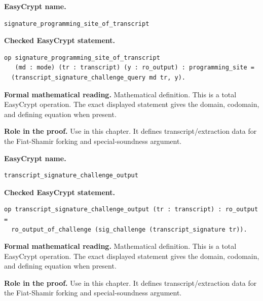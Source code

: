 \begin{formaldefinition}
\noindent\textbf{EasyCrypt name.}
\begin{lstlisting}[language=EasyCrypt,basicstyle=\ttfamily\scriptsize]
signature_programming_site_of_transcript
\end{lstlisting}
\noindent\textbf{Checked EasyCrypt statement.}
\begin{lstlisting}[language=EasyCrypt,basicstyle=\ttfamily\scriptsize]
op signature_programming_site_of_transcript
   (md : mode) (tr : transcript) (y : ro_output) : programming_site =
  (transcript_signature_challenge_query md tr, y).
\end{lstlisting}
\noindent\textbf{Formal mathematical reading.}
Mathematical definition. This is a total EasyCrypt operation.  The exact displayed statement gives the domain, codomain, and defining equation when present.

\noindent\textbf{Role in the proof.}
Use in this chapter. It defines transcript/extraction data for the Fiat-Shamir forking and special-soundness argument.

\end{formaldefinition}

\begin{formaldefinition}
\noindent\textbf{EasyCrypt name.}
\begin{lstlisting}[language=EasyCrypt,basicstyle=\ttfamily\scriptsize]
transcript_signature_challenge_output
\end{lstlisting}
\noindent\textbf{Checked EasyCrypt statement.}
\begin{lstlisting}[language=EasyCrypt,basicstyle=\ttfamily\scriptsize]
op transcript_signature_challenge_output (tr : transcript) : ro_output =
  ro_output_of_challenge (sig_challenge (transcript_signature tr)).
\end{lstlisting}
\noindent\textbf{Formal mathematical reading.}
Mathematical definition. This is a total EasyCrypt operation.  The exact displayed statement gives the domain, codomain, and defining equation when present.

\noindent\textbf{Role in the proof.}
Use in this chapter. It defines transcript/extraction data for the Fiat-Shamir forking and special-soundness argument.

\end{formaldefinition}

